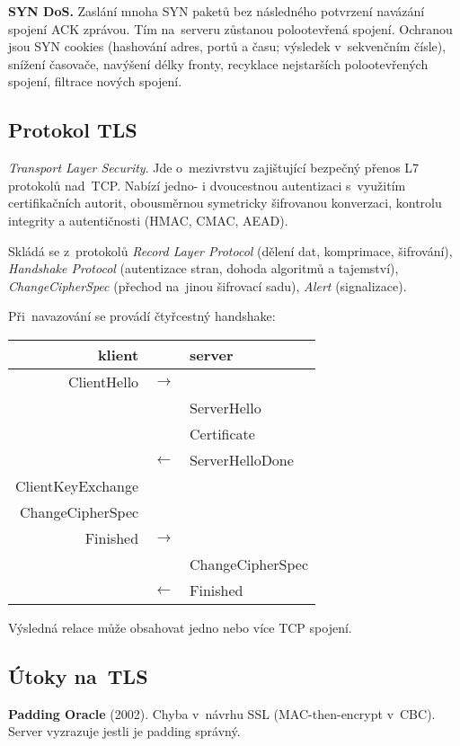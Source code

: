 \textbf{SYN DoS.}
Zaslání mnoha SYN paketů bez následného potvrzení navázání spojení ACK zprávou.
Tím na~serveru zůstanou polootevřená spojení.
Ochranou jsou SYN cookies (hashování adres, portů a času; výsledek v~sekvenčním čísle), snížení časovače, navýšení délky fronty, recyklace nejstarších polootevřených spojení, filtrace nových spojení.


\vfill
\subsection{Protokol TLS}

\emph{Transport Layer Security}.
Jde o~mezivrstvu zajištující bezpečný přenos L7 protokolů nad~TCP.
Nabízí jedno- i dvoucestnou autentizaci s~využitím certifikačních autorit, obousměrnou symetricky šifrovanou konverzaci, kontrolu integrity a autentičnosti (HMAC, CMAC, AEAD).

Skládá se z~protokolů \emph{Record Layer Protocol} (dělení dat, komprimace, šifrování), \emph{Handshake Protocol} (autentizace stran, dohoda algoritmů a tajemství), \emph{ChangeCipherSpec} (přechod na~jinou šifrovací sadu), \emph{Alert} (signalizace).

Při~navazování se provádí čtyřcestný handshake:
\begin{center}
\begin{tabular}{rcl}
	klient & & server \\
	\hline
	ClientHello & $\rightarrow$ & \\
	& & ServerHello \\
	& & Certificate \\
	& $\leftarrow$ & ServerHelloDone \\
	ClientKeyExchange & & \\
	ChangeCipherSpec & & \\
	Finished & $\rightarrow$ & \\
	& & ChangeCipherSpec \\
	& $\leftarrow$ & Finished \\
\end{tabular}
\end{center}
Výsledná relace může obsahovat jedno nebo více TCP spojení.


\subsection{Útoky na~TLS}

\textbf{Padding Oracle} (2002).
Chyba v~návrhu SSL (MAC-then-encrypt v~CBC).
Server vyzrazuje jestli je padding správný.

